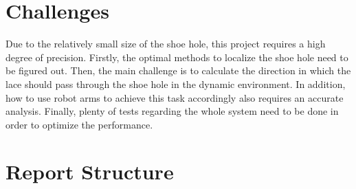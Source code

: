 \section{Challenges}
Due to the relatively small size of the shoe hole, this project requires a high degree of precision. Firstly, the optimal methods to localize the shoe hole need to be figured out. Then, the main challenge is to calculate the direction in which the lace should pass through the shoe hole in the dynamic environment. In addition, how to use robot arms to achieve this task accordingly also requires an accurate analysis. Finally, plenty of tests regarding the whole system need to be done in order to optimize the performance.

\section{Report Structure}
